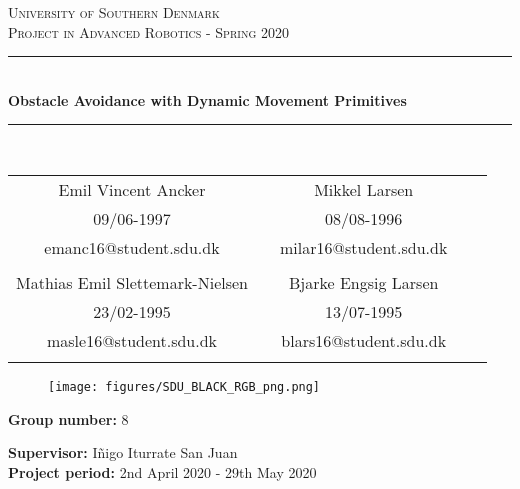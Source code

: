 \documentclass[main.tex]{subfiles}
\begin{document}
\begin{titlepage}
\begin{center}
\textsc{\LARGE University of Southern Denmark}\\[1.5cm]

\textsc{\large Project in Advanced Robotics - Spring 2020}\\[0.5cm]
\rule{\linewidth}{0.5mm}\\[0.4cm]
{ \LARGE \bfseries Obstacle Avoidance with Dynamic Movement Primitives \\[0.4cm]}
\rule{\linewidth}{0.5mm}\\[1.2cm]

\begin{tabular}{c c c c c}
	Emil Vincent Ancker & & Mikkel Larsen\\ 
	09/06-1997 & & 08/08-1996 \\
	emanc16@student.sdu.dk & & milar16@student.sdu.dk \\
	\\
	Mathias Emil Slettemark-Nielsen & & Bjarke Engsig Larsen \\
	23/02-1995 & & 13/07-1995 \\
	masle16@student.sdu.dk & & blars16@student.sdu.dk \\
	\\
\end{tabular}

\vfill
\begin{figure}[H]
\centering
\texttt{[image: figures/SDU\_BLACK\_RGB\_png.png]}
\end{figure}
\vfill


\textbf{Group number:} 8

\textbf{Supervisor:} Iñigo Iturrate San Juan\\ [0.5cm]

\textbf{Project period:} 2nd April 2020 - 29th May 2020

\newcommand{\quickwordcount}[1]{%
  \immediate\write18{texcount -1 -sum -merge sections/introduction.tex sections/robotics.tex sections/vision.tex sections/combination.tex sections/discussion.tex sections/conclusion.tex > #1-words}%
  words%
}

\end{center}
\end{titlepage}
\end{document}
